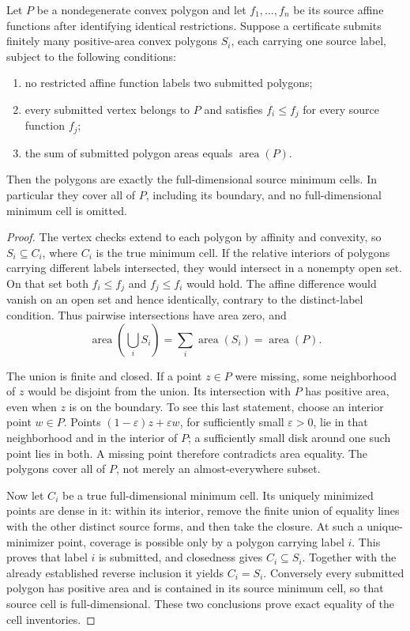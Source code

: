 \begin{theorem}
\label{cv:area-theorem}
Let \(P\) be a nondegenerate convex polygon and let
\(f_1,\ldots,f_n\) be its source affine functions after identifying
identical restrictions.  Suppose a certificate submits finitely
many positive-area convex polygons \(S_i\), each carrying one
source label, subject to the following conditions:
\begin{enumerate}
 \item no restricted affine function labels two submitted polygons;
 \item every submitted vertex belongs to \(P\) and satisfies
       \(f_i\leq f_j\) for every source function \(f_j\);
 \item the sum of submitted polygon areas equals
       \(\operatorname{area}(P)\).
\end{enumerate}
Then the polygons are exactly the full-dimensional source
minimum cells.  In particular they cover all of \(P\), including
its boundary, and no full-dimensional minimum cell is omitted.
\end{theorem}
\begin{proof}
The vertex checks extend to each polygon by affinity and convexity,
so \(S_i\subseteq C_i\), where \(C_i\) is the true minimum cell.
If the relative interiors of polygons carrying different labels
intersected, they would intersect in a nonempty open set.
On that set both \(f_i\leq f_j\) and \(f_j\leq f_i\) would hold.
The affine difference would vanish on an open set and hence
identically, contrary to the distinct-label condition.
Thus pairwise intersections have area zero, and
\[
 \operatorname{area}\left(\bigcup_iS_i\right)
 =\sum_i\operatorname{area}(S_i)
 =\operatorname{area}(P).
\]

The union is finite and closed.  If a point \(z\in P\) were
missing, some neighborhood of \(z\) would be disjoint from the
union.  Its intersection with \(P\) has positive area, even
when \(z\) is on the boundary.  To see this last statement, choose
an interior point \(w\in P\).  Points
\((1-\varepsilon)z+\varepsilon w\), for sufficiently small
\(\varepsilon>0\), lie in that neighborhood and in the interior
of \(P\); a sufficiently small disk around one such point lies
in both.  A missing point therefore contradicts area equality.
The polygons cover all of \(P\), not merely an almost-everywhere
subset.

Now let \(C_i\) be a true full-dimensional minimum cell.
Its uniquely minimized points are dense in it: within its
interior, remove the finite union of equality lines with the other
distinct source forms, and then take the closure.
At such a unique-minimizer point, coverage is possible only by a
polygon carrying label \(i\).
This proves that label \(i\) is submitted, and closedness gives
\(C_i\subseteq S_i\).
Together with the already established reverse inclusion it yields
\(C_i=S_i\).
Conversely every submitted polygon has positive area and is
contained in its source minimum cell, so that source cell is
full-dimensional.  These two conclusions prove exact equality of
the cell inventories.
\end{proof}

